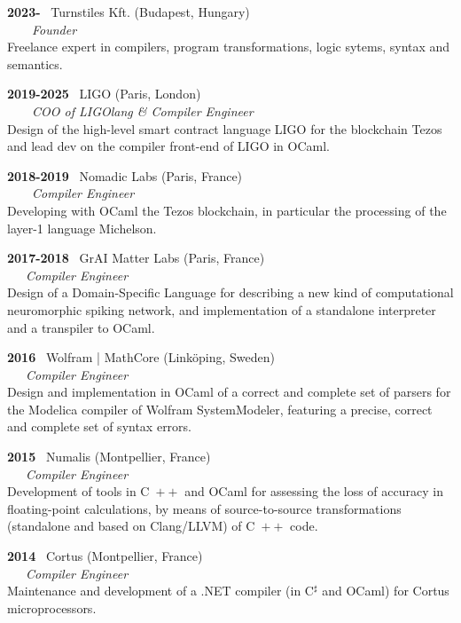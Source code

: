 \documentclass[a4paper,11pt]{article}
\newcommand{\cpp}{\mbox{C \hspace*{-2.5mm} \raise 0.7mm \hbox{${\scriptscriptstyle ++}$}}}
\begin{document}
\noindent\textbf{2023-} \ \textsf{Turnstiles Kft.} (Budapest,
Hungary)\\ \ \ \ \ \emph{Founder}\\
Freelance expert in compilers, program transformations, logic sytems,
syntax and semantics.

\bigskip

\noindent\textbf{2019-2025} \ \textsf{LIGO} (Paris,
London)\\ \ \ \ \ \emph{COO of LIGOlang \& Compiler Engineer}\\ Design
of the high-level smart contract language LIGO for the blockchain
Tezos and lead dev on the compiler front-end of LIGO in OCaml.

\bigskip

\noindent\textbf{2018-2019} \ \textsf{Nomadic Labs} (Paris,
France)\\ \ \ \ \ \emph{Compiler Engineer}\\ Developing with OCaml the
Tezos blockchain, in particular the processing of the layer-1 language
Michelson.

\bigskip

\noindent\textbf{2017-2018} \ \textsf{GrAI Matter Labs} (Paris,
France)\\ \ \ \ \emph{Compiler Engineer}\\ Design of a Domain-Specific
Language for describing a new kind of computational
neuromorphic spiking network, and implementation of a standalone
interpreter and a transpiler to OCaml.

\newpage

\noindent\textbf{2016} \ \textsf{Wolfram | MathCore}
(Link\"oping, Sweden)\\ \ \ \ \emph{Compiler Engineer}\\ Design and
implementation in OCaml of a correct and complete set of parsers
for the Modelica compiler of Wolfram SystemModeler, featuring a
precise, correct and complete set of syntax errors.

\bigskip

\noindent\textbf{2015} \ \textsf{Numalis} (Montpellier,
France)\\ \ \ \ \emph{Compiler Engineer}\\ Development of tools in
\cpp{} and OCaml for assessing the loss of accuracy in floating-point
calculations, by means of source-to-source transformations (standalone
and based on Clang/LLVM) of \cpp{} code.

\bigskip

\noindent\textbf{2014} \ \textsf{Cortus} (Montpellier,
France)\\ \ \ \ \emph{Compiler Engineer}\\ Maintenance and development
of a .NET compiler (in C$^\sharp$ and OCaml) for \textsf{Cortus}
microprocessors.
\end{document}
